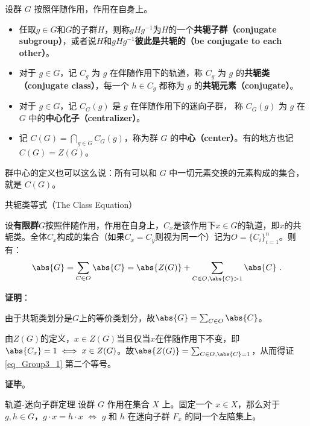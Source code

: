 \begin{definition}{}\label{def_Group3_3}
设群 $G$ 按照伴随作用，作用在自身上。
\begin{itemize}
\item 任取$g\in G$和$G$的子群$H$，则称$gHg^{-1}$为$H$的一个\textbf{共轭子群（conjugate subgroup）}，或者说$H$和$gHg^{-1}$\textbf{彼此是共轭的（be conjugate to each other）}。
\item 对于 $g\in G$，记 $C_g$ 为 $g$ 在伴随作用下的轨道，称 $C_g$ 为 $g$ 的\textbf{共轭类（conjugate class）}，每一个 $h\in C_g$ 都称为 $g$ 的\textbf{共轭元素（conjugate）}。

\item 对于 $g\in G$，记 $C_G(g)$ 是 $g$ 在伴随作用下的迷向子群， 称 $C_G(g)$ 为 $g$ 在 $G$ 中的\textbf{中心化子（centralizer）}。

\item 记 $C(G)=\bigcap_{g\in G} C_G(g)$，称为群 $G$ 的\textbf{中心（center）}。有的地方也记$C(G)=Z(G)$。
\end{itemize}
\end{definition}

群中心的定义也可以这么说：所有可以和 $G$ 中一切元素交换的元素构成的集合，就是 $C(G)$。








\begin{theorem}{共轭类等式（The Class Equation）}\label{the_Group3_4}

设\textbf{有限群}$G$按照伴随作用，作用在自身上，$C_x$是该作用下$x\in G$的轨道，即$x$的共轭类。全体$C_x$构成的集合（如果$C_x=C_y$则视为同一个）记为$O=\{C_i\}_{i=1}^n$。则有：
\begin{equation}\label{eq_Group3_1}
\abs{G} = \sum_{C\in O} \abs{C} = \abs{Z(G)} + \sum_{C\in O, \abs{C}>1} \abs{C}~.
\end{equation}

\end{theorem}


\textbf{证明}：

由于共轭类划分是$G$上的等价类划分，故$\abs{G} = \sum_{C\in O} \abs{C}$。

由$Z(G)$的定义，$x\in Z(G)$当且仅当$x$在伴随作用下不变，即$\abs{C_x}=1\iff x\in Z(G)$。故$\abs{Z(G)}=\sum_{C\in O, \abs{C}=1}$，从而得证\autoref{eq_Group3_1} 第二个等号。

\textbf{证毕}。




\begin{theorem}{轨道-迷向子群定理}\label{the_Group3_2}
设群 $G$ 作用在集合 $X$ 上。固定一个 $x\in X$，那么对于 $g, h\in G$，$g\cdot x= h\cdot x$ $\iff$ $g$ 和 $h$ 在迷向子群 $F_x$ 的同一个左陪集上。
\end{theorem}

